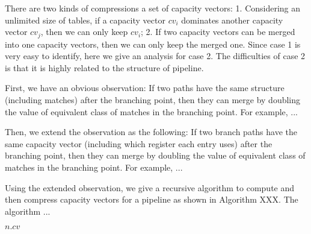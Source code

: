 There are two kinds of compressions a set of capacity vectors: 1. Considering an unlimited size of tables, if a capacity vector $cv_i$ dominates another capacity vector $cv_j$, then we can only keep $cv_i$; 2. If two capacity vectors can be merged into one capacity vectors, then we can only keep the merged one. Since case 1 is very easy to identify, here we give an analysis for case 2. The difficulties of case 2 is that it is highly related to the structure of pipeline.

First, we have an obvious observation: If two paths have the same structure (including matches) after the branching point, then they can merge by doubling the value of equivalent class of matches in the branching point. For example, ...

Then, we extend the observation as the following: If two branch paths have the same capacity vector (including which register each entry uses) after the branching point, then they can merge by doubling the value of equivalent class of matches in the branching point. For example, ...

Using the extended observation, we give a recursive algorithm to compute and then compress capacity vectors for a pipeline as shown in Algorithm XXX. The algorithm ...

\begin{algorithm}
\Return $n.cv$ \;
\end{algorithm}

